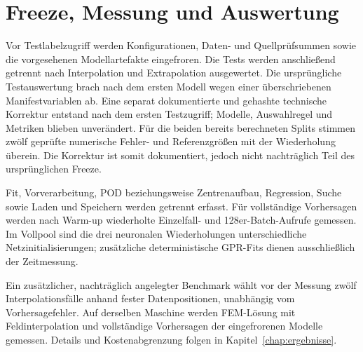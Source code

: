\section{Freeze, Messung und Auswertung}
Vor Testlabelzugriff werden Konfigurationen, Daten- und Quellprüfsummen sowie die vorgesehenen Modellartefakte eingefroren. Die Tests werden anschließend getrennt nach Interpolation und Extrapolation ausgewertet. Die ursprüngliche Testauswertung brach nach dem ersten Modell wegen einer überschriebenen Manifestvariablen ab. Eine separat dokumentierte und gehashte technische Korrektur entstand nach dem ersten Testzugriff; Modelle, Auswahlregel und Metriken blieben unverändert. Für die beiden bereits berechneten Splits stimmen zwölf geprüfte numerische Fehler- und Referenzgrößen mit der Wiederholung überein. Die Korrektur ist somit dokumentiert, jedoch nicht nachträglich Teil des ursprünglichen Freeze.

Fit, Vorverarbeitung, POD beziehungsweise Zentrenaufbau, Regression, Suche sowie Laden und Speichern werden getrennt erfasst. Für vollständige Vorhersagen werden nach Warm-up wiederholte Einzelfall- und 128er-Batch-Aufrufe gemessen. Im Vollpool sind die drei neuronalen Wiederholungen unterschiedliche Netzinitialisierungen; zusätzliche deterministische GPR-Fits dienen ausschließlich der Zeitmessung.

Ein zusätzlicher, nachträglich angelegter Benchmark wählt vor der Messung zwölf Interpolationsfälle anhand fester Datenpositionen, unabhängig vom Vorhersagefehler. Auf derselben Maschine werden FEM-Lösung mit Feldinterpolation und vollständige Vorhersagen der eingefrorenen Modelle gemessen. Details und Kostenabgrenzung folgen in Kapitel~\ref{chap:ergebnisse}.
